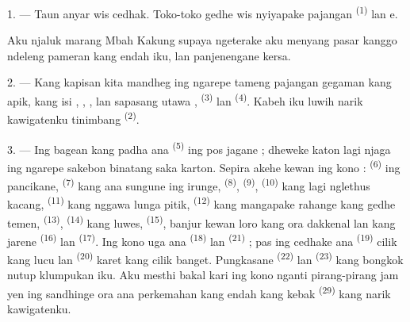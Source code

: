 \VUsaut{4.0mm}
\VUsaut{2.0mm}
\VUsaut{3.4mm}

1. --- Taun anyar wis cedhak. Toko-toko gedhe wis nyiyapake pajangan
 \textsuperscript{(1)} lan e.

Aku njaluk marang Mbah Kakung supaya ngeterake aku menyang pasar
kanggo ndeleng pameran kang endah iku, lan panjenengane kersa.

2. --- Kang kapisan kita mandheg ing ngarepe tameng pajangan gegaman
kang apik, kang isi , ,
,  lan sapasang 
utawa ,  \textsuperscript{(3)} lan
 \textsuperscript{(4)}. Kabeh iku luwih narik kawigatenku
tinimbang  \textsuperscript{(2)}.

\VUsaut{3.0mm}
\VUsaut{2.6mm}

3. --- Ing bagean kang padha ana 
\textsuperscript{(5)} ing pos jagane ; dheweke katon lagi njaga ing
ngarepe sakebon binatang saka karton. Sepira akehe kewan ing kono :
 \textsuperscript{(6)} ing pancikane, 
\textsuperscript{(7)} kang ana sungune ing irunge, 
\textsuperscript{(8)},  \textsuperscript{(9)},
 \textsuperscript{(10)} kang lagi nglethus kacang,
 \textsuperscript{(11)} kang nggawa lunga pitik,
 \textsuperscript{(12)} kang mangapake rahange kang gedhe
temen,  \textsuperscript{(13)}, 
\textsuperscript{(14)} kang luwes, 
\textsuperscript{(15)}, banjur kewan loro kang ora dakkenal lan kang
jarene  \textsuperscript{(16)} lan 
\textsuperscript{(17)}. Ing kono uga ana 
\textsuperscript{(18)} lan  \textsuperscript{(21)} ; pas
ing cedhake ana  \textsuperscript{(19)} cilik kang lucu lan
 \textsuperscript{(20)} karet kang cilik banget.
Pungkasane  \textsuperscript{(22)} lan  \textsuperscript{(23)} kang bongkok nutup klumpukan iku. Aku
mesthi bakal kari ing kono nganti pirang-pirang jam yen ing sandhinge
ora ana perkemahan kang endah kang kebak 
\textsuperscript{(29)} kang narik kawigatenku.

